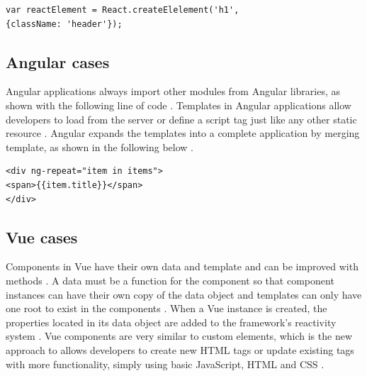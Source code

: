 \documentclass[10pt,journal,compsoc]{IEEEtran}
\begin{document}
\begin{lstlisting}[caption=Pop objects with properties \cite{fedosejev2015react}, label=lst:react]
var reactElement = React.createElelement('h1',
{className: 'header'});
\end{lstlisting}

\subsection{Angular cases}
Angular applications always import other modules from Angular libraries, as shown with the following line of code \cite{cincovic2020comparison}. Templates in Angular applications allow developers to load from the server or define a script tag  just like any other static resource \cite{green2013angularjs}. Angular expands the templates into a complete application by merging template, as shown in the following below \cite{green2013angularjs}.

\begin{lstlisting}[caption=Angular expands templates \cite{green2013angularjs}, label=lst:angular]
<div ng-repeat="item in items">
<span>{{item.title}}</span>
</div>
\end{lstlisting}

\subsection{Vue cases}
Components in Vue have their own data and template and can be improved with methods \cite{cincovic2020comparison}. A data must be a function for the component so that component instances can have their own copy of the data object and templates can only have one root to exist in the components \cite{cincovic2020comparison}. When a Vue instance is created, the properties located in its data object are added to the framework's reactivity system \cite{wohlgethan2018supportingweb}. Vue components are very similar to custom elements, which is the new approach to allows developers to create new HTML tags or update existing tags with more functionality, simply using basic JavaScript, HTML and CSS \cite{wohlgethan2018supportingweb}.
\end{document}
